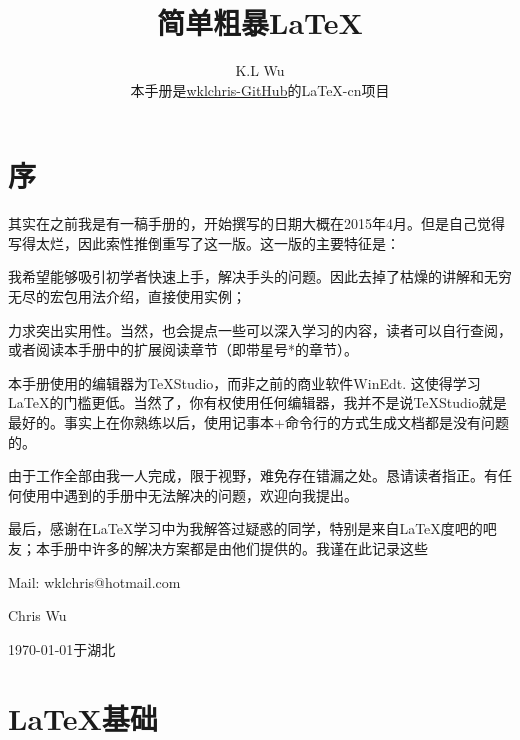 

\title{简单粗暴\LaTeX }
\author{K.L Wu\\
  { 本手册是\href{https://github.com/wklchris/Note-by-LaTeX}{wklchris-GitHub}的\LaTeX{}-cn项目}
}


	
\maketitle

\tableofcontents

\chapter{序}

\dpar\dpar

其实在之前我是有一稿手册的，开始撰写的日期大概在2015年4月。但是自己觉得写得太烂，因此索性推倒重写了这一版。这一版的主要特征是：
\begin{feae}
	\item 我希望能够吸引初学者快速上手，解决手头的问题。因此去掉了枯燥的讲解和无穷无尽的宏包用法介绍，直接使用实例；
	\item 力求突出实用性。当然，也会提点一些可以深入学习的内容，读者可以自行查阅，或者阅读本手册中的扩展阅读章节（即带星号*的章节）。
	\item 本手册使用的编辑器为\TeX Studio，而非之前的商业软件WinEdt. 这使得学习\LaTeX 的门槛更低。当然了，你有权使用任何编辑器，我并不是说\TeX Studio就是最好的。事实上在你熟练以后，使用记事本+命令行的方式生成文档都是没有问题的。
\end{feae}

由于工作全部由我一人完成，限于视野，难免存在错漏之处。恳请读者指正。有任何使用中遇到的手册中无法解决的问题，欢迎向我提出。

最后，感谢在\LaTeX 学习中为我解答过疑惑的同学，特别是来自\LaTeX 度吧的吧友；本手册中许多的解决方案都是由他们提供的。我谨在此记录这些

\vfill

\begin{flushright}
Mail: wklchris@hotmail.com\dpar

Chris Wu

\today 于湖北
\end{flushright}



\chapter{\LaTeX{}基础}
